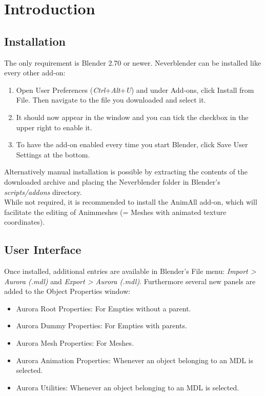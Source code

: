 \chapter{Introduction}

\section{Installation}
The only requirement is Blender 2.70 or newer. Neverblender can be installed
like every other add-on: 
\begin{enumerate}
\item Open User Preferences (\textit{Ctrl}+\textit{Alt}+\textit{U}) and under Add-ons, 
click Install from File. Then navigate to the file you downloaded and select it.
\item It should now appear in the window and you can tick the checkbox in the upper right to enable it.
\item To have the add-on enabled every time you start Blender, click Save User Settings at the bottom.
\end{enumerate}

Alternatively manual installation is possible by extracting the contents of the
downloaded archive and placing the Neverblender folder in Blender's \textit{scripts/addons} directory.\\

While not required, it is recommended to install the AnimAll add-on, which will 
facilitate the editing of Animmeshes (= Meshes with animated texture coordinates).

\section{User Interface}
Once installed, additional entries are available in Blender's File menu: \textit{Import > Aurora (.mdl)} and 
\textit{Export > Aurora (.mdl)}. Furthermore several new panels are added to the Object Properties window:
\begin{itemize}
\item Aurora Root Properties: For Empties without a parent.
\item Aurora Dummy Properties: For Empties with parents.
\item Aurora Mesh Properties: For Meshes.
\item Aurora Animation Properties: Whenever an object belonging to an MDL is selected.
\item Aurora Utilities: Whenever an object belonging to an MDL is selected.
\end{itemize}